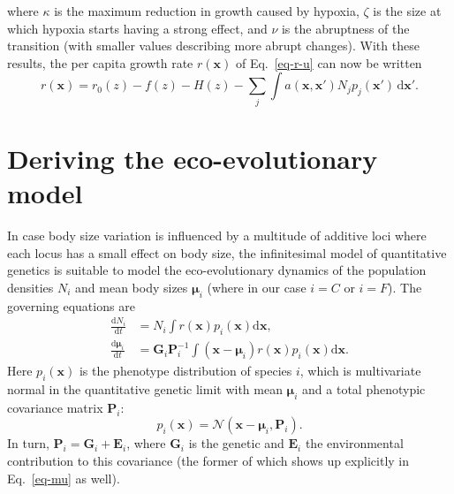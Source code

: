 \documentclass{article}
\newcommand{\mat}[1]{\bm{#1}}
\newcommand{\ud}{\text{d}}
\begin{document}
where $\kappa$ is the maximum reduction in growth caused by hypoxia, $\zeta$ is the size at which hypoxia starts having a strong effect, and $\nu$ is the abruptness of the transition (with smaller values describing more abrupt changes). With these results, the per capita growth rate $r(\mat{x})$ of Eq.~\ref{eq-r-u} can now be written
\begin{equation}
  \label{eq-r-sub}
  r(\mat{x})
  = r_0(z) - f(z) - H(z)
  - \sum_j\int a(\mat{x},\mat{x}') N_j p_j(\mat{x}')\,\ud\mat{x}' .
\end{equation}



\section{Deriving the eco-evolutionary model}

In case body size variation is influenced by a multitude of additive loci where each locus has a small effect on body size, the infinitesimal model of quantitative genetics \citep{Barton2017} is suitable to model the eco-evolutionary dynamics of the population densities $N_i$ and mean body sizes $\mat{\mu}_i$ (where in our case $i = C$ or $i = F$). The governing equations \citep{Barabasetal2022} are
\begin{align}
  \label{eq-N}
  \frac{\ud N_i}{\ud t}
  &= N_i \int r(\mat{x}) p_i(\mat{x}) \ud\mat{x} , \\
  \label{eq-mu}
  \frac{\ud \mat{\mu}_i}{\ud t}
  &= \mat{G}_i\mat{P}_i^{-1}
  \int (\mat{x} - \mat{\mu}_i) r(\mat{x}) p_i(\mat{x}) \ud\mat{x} .
\end{align}
Here $p_i(\mat{x})$ is the phenotype distribution of species $i$, which is multivariate normal in the quantitative genetic limit with mean $\mat{\mu}_i$ and a total phenotypic covariance matrix $\mat{P}_i$:
\begin{equation}
  \label{eq-normdist}
  p_i(\mat{x})
  = \mathcal{N}(\mat{x} - \mat{\mu}_i, \mat{P}_i) .
\end{equation}
In turn, $\mat{P}_i = \mat{G}_i + \mat{E}_i$, where $\mat{G}_i$ is the genetic and $\mat{E}_i$ the environmental contribution to this covariance (the former of which shows up explicitly in Eq.~\ref{eq-mu} as well).
\end{document}
